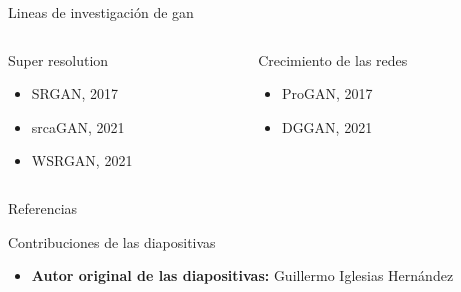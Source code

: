 \begin{frame}{Lineas de investigación de \gls{gan}}

    \begin{columns}[T]
    \begin{column}{0.48\textwidth}
    \alert{\Large Super resolution}
    \begin{itemize}
        \item SRGAN, 2017\cite{ledig2017photo}
        \item srcaGAN, 2021\cite{liu2021super}
        \item WSRGAN, 2021\cite{cao2021weighted}
    \end{itemize}
    \end{column}
    \hfill
    
    \begin{column}{.48\textwidth}
    \alert{\Large Crecimiento de las redes}
    \begin{itemize}
        \item ProGAN, 2017\cite{karras2017progressive}
        \item DGGAN, 2021\cite{liu2021dynamically}
    \end{itemize}
    \end{column}
    \end{columns}
    
\end{frame}


\begin{frame}[allowframebreaks]{Referencias}
    
    
\end{frame}

\begin{frame}{Contribuciones de las diapositivas}
\begin{itemize}
    \item \textbf{Autor original de las diapositivas:} Guillermo Iglesias Hernández
\end{itemize}
\end{frame}

